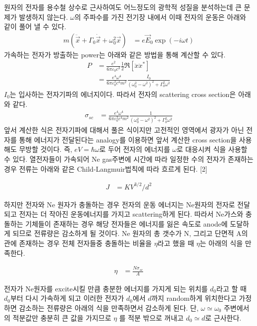 \documentclass[%
 reprint,
 amsmath,amssymb,
 aps,
]{revtex4-2}
\begin{document}
원자의 전자를 용수철 상수로 근사하여도 어느정도의 광학적 성질을 분석하는데 큰 문제가 발생하지 않는다. $\omega$의 주파수를 가진 전기장 내에서 이때 전자의 운동은 아래와 같이 풀어 낼 수 있다.
\begin{align}
	m(\ddot{\vec{x}}+\Gamma_{0}\dot{\vec{x}} + \omega_{0}^{2}\vec{x}) &= e\vec{E}_{0}\exp(-i\omega t)
\end{align}
가속하는 전자가 방출하는 power는 아래와 같은 방법을 통해 계산할 수 있다.
\begin{align}
	P &= \frac{e^{2}}{6\pi\varepsilon_{0}c^{3}}\frac{1}{2}\Re[\ddot{x}\ddot{x}^{*}]\\
	&= \frac{e^{4}\omega^{4}}{6\pi\varepsilon_{0}^{2}c^{4}m^{2}} \frac{I_{0}}{(\omega_{0}^{2}-\omega^{2})^{2}+\Gamma_{0}^{2}\omega^{2}}
\end{align}
$I_{0}$는 입사하는 전자기파의 에너지이다. 따라서 전자의 scattering cross section은 아래와 같다.
\begin{align}
	\sigma_{sc} &= \frac{e^{4}\omega^{4}}{6\pi\varepsilon_{0}^{2}c^{4}m^{2}} \frac{1}{(\omega_{0}^{2}-\omega^{2})^{2}+\Gamma_{0}^{2}\omega^{2}}
\end{align}
앞서 계산한 식은 전자기파에 대해서 풀은 식이지만 고전적인 영역에서 광자가 아닌 전자를 통해 에너지가 전달된다는 analogy를 이용하면 앞서 계산한 cross section을 사용해도 무방할 것이다. 즉, $eV = \hbar \omega$로 두어 전자의 에너지를 $\omega$로 대응시켜 식을 사용할 수 있다. 열전자들이 가속되어 Ne gas주변에 시간에 따라 일정한 수의 전자가 존재하는 경우 전류는 아래와 같은 Child-Langmuir법칙에 따라 흐르게 된다. [2]

\begin{align}
	J &= KV^{3/2}/d^{2}
\end{align}

하지만 전자와 Ne 원자가 충돌하는 경우 전자의 운동 에너지는 Ne원자의 전자로 전달되고 전자는 더 작아진 운동에너지를 가지고 scattering하게 된다.  따라서 Ne가스와 충돌하는 기체들이 존재하는 경우 해당 전자들은 에너지를 잃은 속도로 anode에 도달하게 되므로 전류량은 감소하게 될 것이다. Ne 원자의 총 갯수가 N, 그리고 단면적 A의 관에 존재하는 경우 전체 전자들중 충돌하는 비율을 $\eta$라고 했을 때 $\eta$는 아래의 식을 만족한다.

\begin{align}
	\eta &= \frac{N\sigma_{sc}}{A}
\end{align}

전자가 Ne원자를 excite시킬 만큼 충분한 에너지를 가지게 되는 위치를 $d_{0}$라고 할 때 $d_{0}$부터 다시 가속하게 되고 이러한 전자가 $d_{0}$에서 $d$까지 random하게 위치한다고 가정하면 감소하는 전류량은 아래의 식을 만족하면서 감소하게 된다. 단, $\omega \simeq \omega_{0}$ 주변에서의 적분값만 충분히 큰 값을 가지므로 $\eta$ 를 적분 밖으로 꺼내고 $d_{0}\simeq d$로 근사한다.
\end{document}
